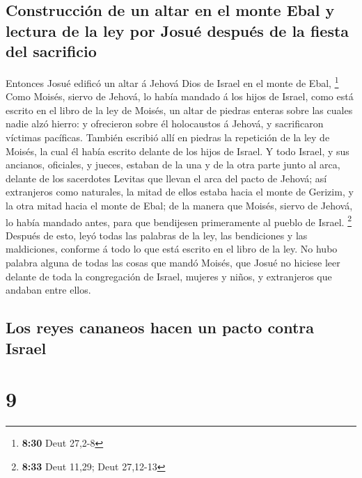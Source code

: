 \hypertarget{construcciuxf3n-de-un-altar-en-el-monte-ebal-y-lectura-de-la-ley-por-josuuxe9-despuuxe9s-de-la-fiesta-del-sacrificio}{%
\subsection{Construcción de un altar en el monte Ebal y lectura de la
ley por Josué después de la fiesta del
sacrificio}\label{construcciuxf3n-de-un-altar-en-el-monte-ebal-y-lectura-de-la-ley-por-josuuxe9-despuuxe9s-de-la-fiesta-del-sacrificio}}

 Entonces Josué edificó un altar á Jehová Dios de Israel
en el monte de Ebal, \footnote{\textbf{8:30} Deut 27,2-8}
 Como Moisés, siervo de Jehová, lo había mandado á los
hijos de Israel, como está escrito en el libro de la ley de Moisés, un
altar de piedras enteras sobre las cuales nadie alzó hierro: y
ofrecieron sobre él holocaustos á Jehová, y sacrificaron víctimas
pacíficas.  También escribió allí en piedras la
repetición de la ley de Moisés, la cual él había escrito delante de los
hijos de Israel.  Y todo Israel, y sus ancianos,
oficiales, y jueces, estaban de la una y de la otra parte junto al arca,
delante de los sacerdotes Levitas que llevan el arca del pacto de
Jehová; así extranjeros como naturales, la mitad de ellos estaba hacia
el monte de Gerizim, y la otra mitad hacia el monte de Ebal; de la
manera que Moisés, siervo de Jehová, lo había mandado antes, para que
bendijesen primeramente al pueblo de Israel. \footnote{\textbf{8:33}
  Deut 11,29; Deut 27,12-13}  Después de esto, leyó todas
las palabras de la ley, las bendiciones y las maldiciones, conforme á
todo lo que está escrito en el libro de la ley.  No hubo
palabra alguna de todas las cosas que mandó Moisés, que Josué no hiciese
leer delante de toda la congregación de Israel, mujeres y niños, y
extranjeros que andaban entre ellos.

\hypertarget{los-reyes-cananeos-hacen-un-pacto-contra-israel}{%
\subsection{Los reyes cananeos hacen un pacto contra
Israel}\label{los-reyes-cananeos-hacen-un-pacto-contra-israel}}

\hypertarget{section-8}{%
\section{9}\label{section-8}}

